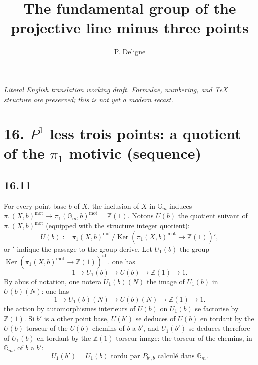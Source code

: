 \documentclass[12pt,a4paper]{article}
\title{The fundamental group of the projective line minus three points}
\author{P. Deligne}
\date{}
\theoremstyle{plain}
\theoremstyle{definition}
\theoremstyle{remark}
\DeclareMathOperator{\Ker}{Ker}
\newcommand{\mot}{\mathrm{mot}}
\newcommand{\Gm}{\mathbb{G}_m}
\newcommand{\ZZ}{\mathbb{Z}}
\begin{document}
\begin{center}\small\emph{Literal English translation working draft. Formulae, numbering, and TeX structure are preserved; this is not yet a modern recast.}\end{center}
\vspace{0.5em}

\maketitle


\section*{16. $P^1$ less trois points: a quotient of the $\pi_1$ motivic (sequence)}

\subsection*{16.11}

For every point base $b$ of $X$, the inclusion of $X$ in $\Gm$ induces
$\pi_1(X,b)^\mot \to \pi_1(\Gm,b)^\mot = \ZZ(1)$.
Notons $U(b)$ the quotient suivant of $\pi_1(X,b)^\mot$ (equipped with the structure
integer quotient):
\begin{equation}\label{eq:16.11.0}
U(b) := \pi_1(X,b)^\mot / \Ker(\pi_1(X,b)^\mot \to \ZZ(1))',
\end{equation}
or $'$ indique the passage to the group derive. Let $U_1(b)$ the group
$\Ker(\pi_1(X,b)^\mot \to \ZZ(1))^{\mathrm{ab}}$. one has
\begin{equation}\label{eq:16.11.1}
1 \to U_1(b) \to U(b) \to \ZZ(1) \to 1.
\end{equation}
By abus of notation, one notera $U_1(b)(N)$ the image of $U_1(b)$ in
$U(b)(N)$: one has
\begin{equation}\label{eq:16.11.2}
1 \to U_1(b)(N) \to U(b)(N) \to \ZZ(1) \to 1.
\end{equation}
the action by automorphismes interieurs of $U(b)$ on $U_1(b)$ se factorise
by $\ZZ(1)$. Si $b'$ is a other point base, $U(b')$ se deduces of $U(b)$
en tordant by the $U(b)$-torseur of the $U(b)$-chemins of $b$ a $b'$, and
$U_1(b')$ se deduces therefore of $U_1(b)$ en tordant by the $\ZZ(1)$-torseur
image: the torseur of the chemins, in $\Gm$, of $b$ a $b'$:
\begin{equation}\label{eq:16.11.3}
U_1(b') = U_1(b) \text{ tordu par } P_{b',b} \text{ calcul\'e dans } \Gm.
\end{equation}
\end{document}
